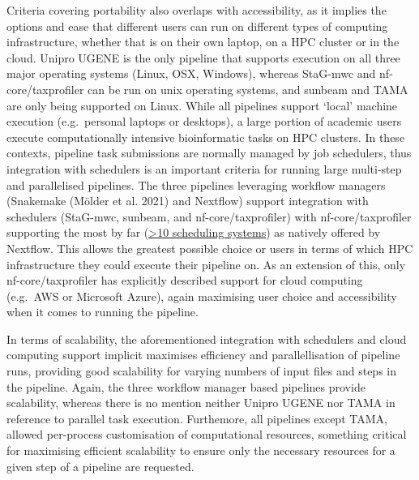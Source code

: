 \documentclass[
]{article}
\begin{document}
Criteria covering portability also overlaps with accessibility, as it
implies the options and ease that different users can run on different
types of computing infrastructure, whether that is on their own laptop,
on a HPC cluster or in the cloud. Unipro UGENE is the only pipeline that
supports execution on all three major operating systems (Linux, OSX,
Windows), whereas StaG-mwc and nf-core/taxprofiler can be run on unix
operating systems, and sunbeam and TAMA are only being supported on
Linux. While all pipelines support `local' machine execution
(e.g.~personal laptops or desktops), a large portion of academic users
execute computationally intensive bioinformatic tasks on HPC clusters.
In these contexts, pipeline task submissions are normally managed by job
schedulers, thus integration with schedulers is an important criteria
for running large multi-step and parallelised pipelines. The three
pipelines leveraging workflow managers (Snakemake (Mölder et al. 2021)
and Nextflow) support integration with schedulers (StaG-mwc, sunbeam,
and nf-core/taxprofiler) with nf-core/taxprofiler supporting the most by
far
(\href{https://www.nextflow.io/docs/latest/executor.html}{\textgreater10
scheduling systems}) as natively offered by Nextflow. This allows the
greatest possible choice or users in terms of which HPC infrastructure
they could execute their pipeline on. As an extension of this, only
nf-core/taxprofiler has explicitly described support for cloud computing
(e.g.~AWS or Microsoft Azure), again maximising user choice and
accessibility when it comes to running the pipeline.

In terms of scalability, the aforementioned integration with schedulers
and cloud computing support implicit maximises efficiency and
parallellisation of pipeline runs, providing good scalability for
varying numbers of input files and steps in the pipeline. Again, the
three workflow manager based pipelines provide scalability, whereas
there is no mention neither Unipro UGENE nor TAMA in reference to
parallel task execution. Furthemore, all pipelines except TAMA, allowed
per-process customisation of computational resources, something critical
for maximising efficient scalability to ensure only the necessary
resources for a given step of a pipeline are requested.
\end{document}

